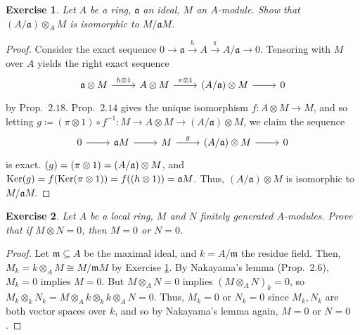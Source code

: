 \documentclass[12pt,letterpaper]{article}
\newtheorem{problem}{Exercise}[section]
\theoremstyle{definition}
\theoremstyle{remark}
\numberwithin{figure}{problem}
\numberwithin{equation}{section}
\let\Im\relax
\DeclareMathOperator{\Im}{Im}
\DeclareMathOperator{\Ker}{Ker}
\begin{document}
\begin{problem}\label{exc:2.2}
  Let $A$ be a ring, $\mathfrak{a}$ an ideal, $M$ an $A$-module. Show that $(A/\mathfrak{a}) \otimes_A M$ is isomorphic to $M/\mathfrak{a}M$.
\end{problem}
\begin{proof}
  Consider the exact sequence $0 \to \mathfrak{a} \xrightarrow{h} A \xrightarrow{\pi} A/\mathfrak{a} \to 0$. Tensoring with $M$ over $A$ yields the right exact sequence
  \begin{equation*}
    \begin{tikzcd}
      \mathfrak{a} \otimes M \rar{h \otimes 1} & A \otimes M \rar{\pi \otimes 1} & (A/\mathfrak{a}) \otimes M \rar & 0
    \end{tikzcd}
  \end{equation*}
  by Prop.~$2.18$. Prop.~$2.14$ gives the unique isomorphism $f\colon A \otimes M \to M$, and so letting $g\coloneqq (\pi \otimes 1) \circ f^{-1} \colon M \to A \otimes M \to (A/\mathfrak{a}) \otimes M$, we claim the sequence
  \begin{equation*}
    \begin{tikzcd}
      0 \rar & \mathfrak{a}M \rar & M \rar{g} & (A/\mathfrak{a}) \otimes M \rar & 0
    \end{tikzcd}
  \end{equation*}
  is exact. $\Im(g) = \Im(\pi \otimes 1) = (A/\mathfrak{a}) \otimes M$, and $\Ker(g) = f(\Ker(\pi \otimes 1)) = f(\Im(h \otimes 1)) = \mathfrak{a}M$. Thus, $(A/\mathfrak{a}) \otimes M$ is isomorphic to $M/\mathfrak{a}M$.
\end{proof}

\begin{problem}
  Let $A$ be a local ring, $M$ and $N$ finitely generated $A$-modules. Prove that if $M \otimes N = 0$, then $M = 0$ or $N = 0$.
\end{problem}
\begin{proof}
  Let $\mathfrak{m} \subseteq A$ be the maximal ideal, and $k = A/\mathfrak{m}$ the residue field. Then, $M_k = k \otimes_A M \cong M/\mathfrak{m}M$ by Exercise \ref{exc:2.2}. By Nakayama's lemma (Prop.~2.6), $M_k = 0$ implies $M = 0$. But $M \otimes_A N = 0$ implies $(M \otimes_A N)_k = 0$, so $M_k \otimes_k N_k = M \otimes_A k \otimes_k k \otimes_A N = 0$. Thus, $M_k = 0$ or $N_k = 0$ since $M_k,N_k$ are both vector spaces over $k$, and so by Nakayama's lemma again, $M = 0$ or $N = 0$.
\end{proof}
\end{document}
